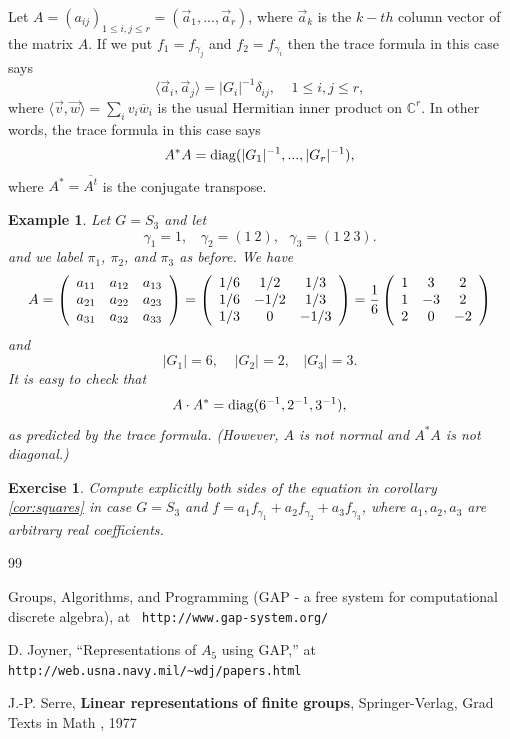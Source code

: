 \documentclass[12pt]{article}
\newtheorem{example}[theorem]{Example}
\newtheorem{exercise}[theorem]{Exercise}
\def\ccc{\mathbb{C}}
\begin{document}
Let $A=(a_{ij})_{1\leq i,j\leq r}=(\vec{a}_1,...,\vec{a}_r)$,
where $\vec{a}_k$ is the $k-th$ column vector of the matrix $A$.
If we put $f_1=f_{\gamma_j}$ and $f_2=f_{\gamma_i}$
then the trace formula in this case says 
\[
\langle \vec{a}_i,\vec{a}_j\rangle
=|G_i|^{-1}\delta_{ij},\ \ \ \ \ 1\leq i,j\leq r,
\]
where $\langle\vec{v},\vec{w}\rangle =\sum_i v_i\overline{w}_i$ is the usual 
Hermitian inner
product on $\ccc^r$. In other words, the trace formula in this 
case says 
\[
A^*A={\rm diag}(|G_1|^{-1},...,|G_r|^{-1}),
\]
where $A^* = \overline{A^t}$ is the conjugate transpose.

\begin{example} Let $G=S_3$ and let
\[
\gamma_1=1,\ \ \ \ \gamma_2=(1\ 2),\ \ \ \gamma_3=(1\ 2\ 3).
\]
and we label $\pi_1$, $\pi_2$, and $\pi_3$ as before. We have
\[
A=
\left(
\begin{array}{ccc}
a_{11} & a_{12} & a_{13}  \\
a_{21} & a_{22} & a_{23}  \\
a_{31} & a_{32} & a_{33}  
\end{array}
\right)
=\left(
\begin{array}{ccc}
1/6 & 1/2 & 1/3 \\
1/6 & -1/2 & 1/3 \\
1/3 & 0 & -1/3  
\end{array}
\right)
=
{1\over 6}
\left(
\begin{array}{ccc}
1 & 3 & 2 \\
1 & -3 & 2 \\
2 & 0 & -2  
\end{array}
\right)
\]
and
\[
|G_1|=6,\ \ \ \ \ |G_2|=2,\ \ \ \ |G_3|=3.
\]
It is easy to check that
\[
A\cdot A^* ={\rm diag}(6^{-1},2^{-1},3^{-1}),
\]
as predicted by the trace formula.
(However, $A$ is not normal and $A^*A$ is not
diagonal.)
\end{example}

\begin{exercise} Compute explicitly both sides of the
equation in corollary \ref{cor:squares} in case $G=S_3$ and 
$f=a_1f_{\gamma_1}+a_2f_{\gamma_2}+a_3f_{\gamma_3}$,
where $a_1,a_2,a_3$ are arbitrary real coefficients.
\end{exercise}

\begin{thebibliography}{99}  

 Groups, Algorithms, and Programming
(GAP - a free system for computational discrete algebra), at
\newline
\verb+ http://www.gap-system.org/+

 D. Joyner, ``Representations of $A_5$ using GAP,''
at
\newline
\verb+http://web.usna.navy.mil/~wdj/papers.html+

J.-P. Serre, {\bf Linear representations of finite groups}, 
Springer-Verlag, Grad Texts in Math 
, 1977

\end{thebibliography}
\end{document}
